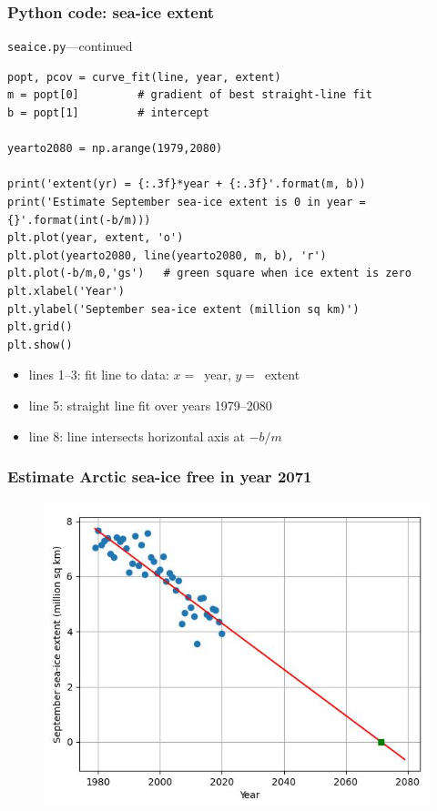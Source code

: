 \documentclass[english,14pt]{beamer}
\begin{document}
\begin{frame}[fragile]

\frametitle{Python code: sea-ice extent}

\vspace*{-3mm}

\texttt{seaice.py}---continued
\vspace*{-1mm}
\begin{lstlisting}[style=CStyle,basicstyle=\scriptsize]
popt, pcov = curve_fit(line, year, extent)
m = popt[0]         # gradient of best straight-line fit
b = popt[1]         # intercept

yearto2080 = np.arange(1979,2080)

print('extent(yr) = {:.3f}*year + {:.3f}'.format(m, b))
print('Estimate September sea-ice extent is 0 in year = {}'.format(int(-b/m)))
plt.plot(year, extent, 'o')
plt.plot(yearto2080, line(yearto2080, m, b), 'r')
plt.plot(-b/m,0,'gs')   # green square when ice extent is zero
plt.xlabel('Year')
plt.ylabel('September sea-ice extent (million sq km)')
plt.grid()
plt.show()
\end{lstlisting}
\vspace*{-2mm}
\begin{itemize}
	\item lines 1--3: fit line to data: $x=$~year, $y=$~extent
	\item line 5: straight line fit over years 1979--2080
	\item line 8: line intersects horizontal axis at $-b/m$
\end{itemize}

\end{frame}


\begin{frame}[fragile]

\frametitle{Estimate Arctic sea-ice free in year 2071}

\begin{figure}[ht]
	\centering
	\includegraphics[width=.8\textwidth]{figures/seaiceextentOutput}
\end{figure}

\end{frame}
\end{document}
